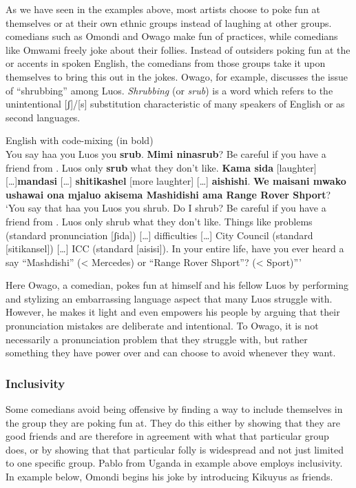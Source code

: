\documentclass[output=paper]{langsci/langscibook}
\begin{document}
As we have seen in the examples above, most artists choose to poke fun at themselves or at their own ethnic groups instead of laughing at other groups.  comedians such as Omondi and Owago make fun of  practices, while  comedians like Omwami freely joke about their  follies. Instead of outsiders poking fun at the  or  accents in spoken English, the comedians from those groups take it upon themselves to bring this out in the jokes. Owago, for example, discusses the issue of “shrubbing” among Luos. \textit{Shrubbing} (or \textit{srub}) is a  word which refers to the unintentional [ʃ]/[s] substitution characteristic of many  speakers of English or  as second languages.

\ea
{English with  code-mixing (in bold)}\\
\smallskip
 You say haa you Luos you \textbf{srub}. \textbf{Mimi ninasrub}? Be careful if you have a friend from . Luos only \textbf{srub} what they don’t like. \textbf{Kama sida} \textup{[laughter]} […]\textbf{mandasi} […] \textbf{shitikashel} \textup{[more laughter]} […] \textbf{aishishi}. \textbf{We maisani mwako ushawai ona mjaluo akisema Mashidishi ama Range Rover Shport}?\\
‘You say that haa you Luos you shrub. Do I shrub? Be careful if you have a friend from . Luos only shrub what they don’t like. Things like problems (standard pronunciation [ʃida]) […] difficulties […] City Council (standard [sitikansel]) […] ICC (standard [aisisi]). In your entire life, have you ever heard a  say “Mashdishi” (< Mercedes) or “Range Rover Shport”? (< Sport)”’ \citep{Churchill2013}
\z

Here Owago, a  comedian, pokes fun at himself and his fellow Luos by performing and stylizing an embarrassing language aspect that many Luos struggle with. However, he makes it light and even empowers his people by arguing that their pronunciation mistakes are deliberate and intentional. To Owago, it is not necessarily a pronunciation problem that they struggle with, but rather something they have power over and can choose to avoid whenever they want.

\subsubsection{Inclusivity }

Some comedians avoid being offensive by finding a way to include themselves in the group they are poking fun at. They do this either by showing that they are good friends and are therefore in agreement with what that particular group does, or by showing that that particular folly is widespread and not just limited to one specific group. Pablo from Uganda in example  above employs inclusivity. In example  below, Omondi begins his joke by introducing Kikuyus as friends. 
\end{document}
